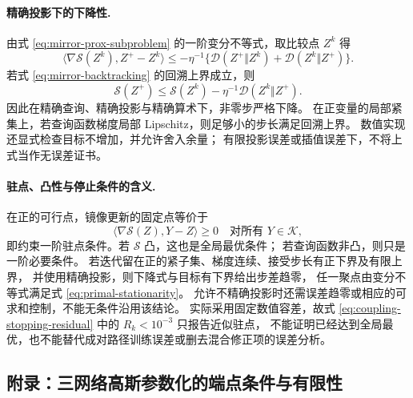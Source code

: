 \documentclass[UTF8,a4paper,11pt,fontset=fandol]{ctexart}
\begin{document}
\paragraph{精确投影下的下降性.}
由式 \eqref{eq:mirror-prox-subproblem} 的一阶变分不等式，取比较点 $Z^k$ 得
\begin{equation}
\langle\nabla\mathscr S(Z^k),Z^+-Z^k\rangle
\le-\eta^{-1}\{\mathcal D(Z^+\Vert Z^k)+\mathcal D(Z^k\Vert Z^+)\}.
\end{equation}
若式 \eqref{eq:mirror-backtracking} 的回溯上界成立，则
\begin{equation}
\mathscr S(Z^+)\le\mathscr S(Z^k)-\eta^{-1}\mathcal D(Z^k\Vert Z^+).
\label{eq:mirror-descent-decrease}
\end{equation}
因此在精确查询、精确投影与精确算术下，非零步严格下降。
在正变量的局部紧集上，若查询函数梯度局部 Lipschitz，则足够小的步长满足回溯上界。
数值实现还显式检查目标不增加，并允许舍入余量；
有限投影误差或插值误差下，不将上式当作无误差证书。

\paragraph{驻点、凸性与停止条件的含义.}
在正的可行点，镜像更新的固定点等价于
\begin{equation}
\langle\nabla\mathscr S(Z),Y-Z\rangle\ge0
\quad\text{对所有 }Y\in\mathcal K,
\label{eq:primal-stationarity}
\end{equation}
即约束一阶驻点条件。若 $\mathscr S$ 凸，这也是全局最优条件；
若查询函数非凸，则只是一阶必要条件。
若迭代留在正的紧子集、梯度连续、接受步长有正下界及有限上界，
并使用精确投影，则下降式与目标有下界给出步差趋零，
任一聚点由变分不等式满足式 \eqref{eq:primal-stationarity}。
允许不精确投影时还需误差趋零或相应的可求和控制，不能无条件沿用该结论。
实际采用固定数值容差，故式 \eqref{eq:coupling-stopping-residual} 中的 $R_k<10^{-3}$ 只报告近似驻点，
不能证明已经达到全局最优，也不能替代成对路径训练误差或删去混合修正项的误差分析。

\clearpage
\setcounter{equation}{0}
\renewcommand{\theequation}{E.\arabic{equation}}
\renewcommand{\theHequation}{E.\arabic{equation}}
\subsection*{附录：三网络高斯参数化的端点条件与有限性}
\end{document}
